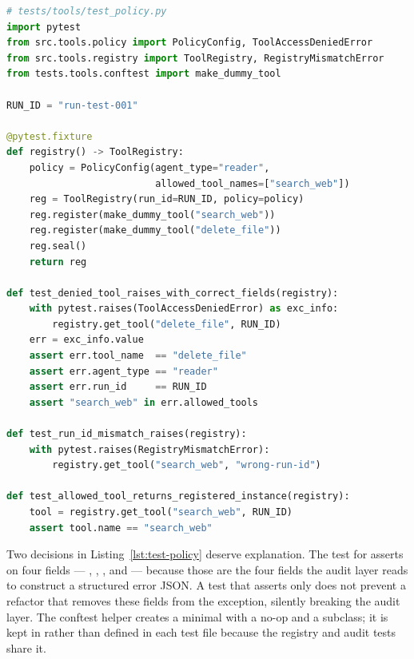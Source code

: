 \begin{lstlisting}[language=Python,
  caption={Policy enforcement tests: field assertions, not just exception types},
  label={lst:test-policy}]
# tests/tools/test_policy.py
import pytest
from src.tools.policy import PolicyConfig, ToolAccessDeniedError
from src.tools.registry import ToolRegistry, RegistryMismatchError
from tests.tools.conftest import make_dummy_tool

RUN_ID = "run-test-001"

@pytest.fixture
def registry() -> ToolRegistry:
    policy = PolicyConfig(agent_type="reader",
                          allowed_tool_names=["search_web"])
    reg = ToolRegistry(run_id=RUN_ID, policy=policy)
    reg.register(make_dummy_tool("search_web"))
    reg.register(make_dummy_tool("delete_file"))
    reg.seal()
    return reg

def test_denied_tool_raises_with_correct_fields(registry):
    with pytest.raises(ToolAccessDeniedError) as exc_info:
        registry.get_tool("delete_file", RUN_ID)
    err = exc_info.value
    assert err.tool_name  == "delete_file"
    assert err.agent_type == "reader"
    assert err.run_id     == RUN_ID
    assert "search_web" in err.allowed_tools

def test_run_id_mismatch_raises(registry):
    with pytest.raises(RegistryMismatchError):
        registry.get_tool("search_web", "wrong-run-id")

def test_allowed_tool_returns_registered_instance(registry):
    tool = registry.get_tool("search_web", RUN_ID)
    assert tool.name == "search_web"
\end{lstlisting}

Two decisions in Listing~\ref{lst:test-policy} deserve explanation.
The test for  asserts on four fields ---
, , , and
 --- because those are the four fields the audit layer
reads to construct a structured error JSON. A test that asserts only
 does not prevent a refactor
that removes these fields from the exception, silently breaking the audit
layer. The  conftest helper creates a minimal
 with a no-op  and a
 subclass; it is kept in 
rather than defined in each test file because the registry and audit tests
share it.

